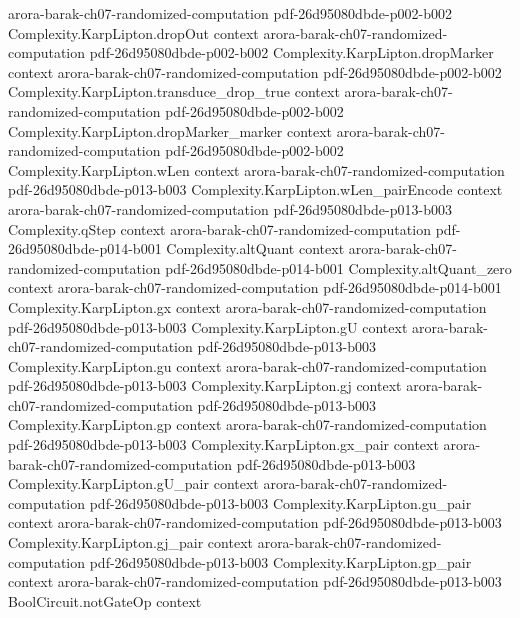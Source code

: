\begin{theorem}
  {arora-barak-ch07-randomized-computation}
  {pdf-26d95080dbde-p002-b002}
\proofstep
  {Complexity.KarpLipton.dropOut}
  {context}
  {arora-barak-ch07-randomized-computation}
  {pdf-26d95080dbde-p002-b002}
\proofstep
  {Complexity.KarpLipton.dropMarker}
  {context}
  {arora-barak-ch07-randomized-computation}
  {pdf-26d95080dbde-p002-b002}
\proofstep
  {Complexity.KarpLipton.transduce_drop_true}
  {context}
  {arora-barak-ch07-randomized-computation}
  {pdf-26d95080dbde-p002-b002}
\proofstep
  {Complexity.KarpLipton.dropMarker_marker}
  {context}
  {arora-barak-ch07-randomized-computation}
  {pdf-26d95080dbde-p002-b002}
\proofstep
  {Complexity.KarpLipton.wLen}
  {context}
  {arora-barak-ch07-randomized-computation}
  {pdf-26d95080dbde-p013-b003}
\proofstep
  {Complexity.KarpLipton.wLen_pairEncode}
  {context}
  {arora-barak-ch07-randomized-computation}
  {pdf-26d95080dbde-p013-b003}
\proofstep
  {Complexity.qStep}
  {context}
  {arora-barak-ch07-randomized-computation}
  {pdf-26d95080dbde-p014-b001}
\proofstep
  {Complexity.altQuant}
  {context}
  {arora-barak-ch07-randomized-computation}
  {pdf-26d95080dbde-p014-b001}
\proofstep
  {Complexity.altQuant_zero}
  {context}
  {arora-barak-ch07-randomized-computation}
  {pdf-26d95080dbde-p014-b001}
\proofstep
  {Complexity.KarpLipton.gx}
  {context}
  {arora-barak-ch07-randomized-computation}
  {pdf-26d95080dbde-p013-b003}
\proofstep
  {Complexity.KarpLipton.gU}
  {context}
  {arora-barak-ch07-randomized-computation}
  {pdf-26d95080dbde-p013-b003}
\proofstep
  {Complexity.KarpLipton.gu}
  {context}
  {arora-barak-ch07-randomized-computation}
  {pdf-26d95080dbde-p013-b003}
\proofstep
  {Complexity.KarpLipton.gj}
  {context}
  {arora-barak-ch07-randomized-computation}
  {pdf-26d95080dbde-p013-b003}
\proofstep
  {Complexity.KarpLipton.gp}
  {context}
  {arora-barak-ch07-randomized-computation}
  {pdf-26d95080dbde-p013-b003}
\proofstep
  {Complexity.KarpLipton.gx_pair}
  {context}
  {arora-barak-ch07-randomized-computation}
  {pdf-26d95080dbde-p013-b003}
\proofstep
  {Complexity.KarpLipton.gU_pair}
  {context}
  {arora-barak-ch07-randomized-computation}
  {pdf-26d95080dbde-p013-b003}
\proofstep
  {Complexity.KarpLipton.gu_pair}
  {context}
  {arora-barak-ch07-randomized-computation}
  {pdf-26d95080dbde-p013-b003}
\proofstep
  {Complexity.KarpLipton.gj_pair}
  {context}
  {arora-barak-ch07-randomized-computation}
  {pdf-26d95080dbde-p013-b003}
\proofstep
  {Complexity.KarpLipton.gp_pair}
  {context}
  {arora-barak-ch07-randomized-computation}
  {pdf-26d95080dbde-p013-b003}
\proofstep
  {BoolCircuit.notGateOp}
  {context}

\end{theorem}
